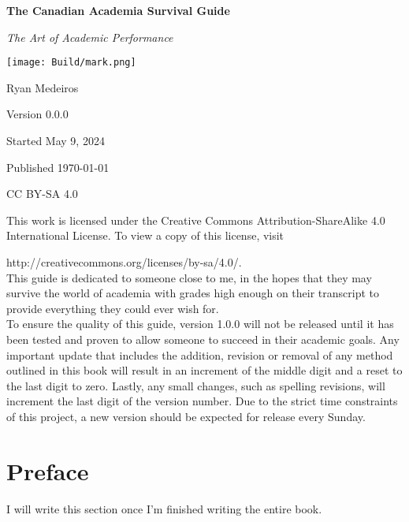 \documentclass{book}
\begin{document}
\frontmatter
	\newcommand*{\titles}[7]
	{
	\begin{titlepage}
	\centering
	\bfseries \Huge  #1	\par
	\vspace{1.0cm}
	\itshape  \Large #2	\par

	\vspace{1.0cm}

	\texttt{[image: Build/mark.png]}

	\vfill\raggedleft\normalsize 

	#3	\par
	#4	\par
	#5	\par
	#6	\par
	#7	\par
	\end{titlepage}
	}
	\titles{The Canadian Academia Survival Guide}{The Art of Academic Performance}{Ryan Medeiros}{Version 0.0.0}{Started May 9, 2024}{Published \today}{CC BY-SA 4.0}

This work is licensed under the Creative Commons Attribution-ShareAlike 4.0 International License. To view a copy of this license, visit

\noindent http://creativecommons.org/licenses/by-sa/4.0/. \\

This guide is dedicated to someone close to me, in the hopes that they may survive the world of academia with grades high enough on their transcript to provide everything they could ever wish for. \\

To ensure the quality of this guide, version 1.0.0 will not be released until it has been tested and proven to allow someone to succeed in their academic goals. Any important update that includes the addition, revision or removal of any method outlined in this book will result in an increment of the middle digit and a reset to the last digit to zero. Lastly, any small changes, such as spelling revisions, will increment the last digit of the version number. Due to the strict time constraints of this project, a new version should be expected for release every Sunday.  

\hfill\vfill

\chapter{Preface}

I will write this section once I'm finished writing the entire book. 
\end{document}
